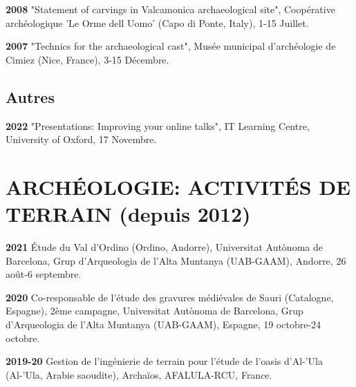 \documentclass{article}
\newcommand{\fr}[1]{#1}       %
\newcommand{\en}[1]{}     %
\begin{document}
\smallbreak
\textbf{2008 }
\fr{"Statement of carvings in Valcamonica archaeological site", Coopérative archéologique 'Le Orme dell Uomo' (Capo di Ponte, Italy), 1-15 Juillet.}
\en{"Statement of Carvings at Valcamonica Archaeological Site", Archaeological Cooperative 'Le Orme dell Uomo' (Capo di Ponte, Italy), July 1-15.}

\smallbreak
\textbf{2007 }
\fr{"Technics for the archaeological cast", Musée municipal d'archéologie de Cimiez (Nice, France), 3-15 Décembre.}
\en{"Techniques for the Archaeological Cast", Municipal Museum of Archaeology of Cimiez (Nice, France), December 3-15.}

\smallbreak

\subsection*{\fr{Autres}\en{Other}}

\textbf{2022 }
\fr{"Presentations: Improving your online talks", IT Learning Centre, University of Oxford, 17 Novembre.}
\en{"Presentations: Improving Your Online Talks", IT Learning Centre, University of Oxford, November 17.}
\smallbreak


\section{\fr{ARCHÉOLOGIE: ACTIVITÉS DE TERRAIN (depuis 2012)}\en{ARCHAEOLOGY: FIELD ACTIVITIES (since 2012)}}

\textbf{2021}
\fr{Étude du Val d'Ordino (Ordino, Andorre), Universitat Autònoma de Barcelona, Grup d'Arqueologia de l'Alta Muntanya (UAB-GAAM), Andorre, 26 août-6 septembre.}
\en{Study of the Val d'Ordino (Ordino, Andorra), Autonomous University of Barcelona, High Mountain Archaeology Group (UAB-GAAM), Andorra, August 26 - September 6.}

\smallbreak
\textbf{2020}
\fr{Co-responsable de l'étude des gravures médiévales de Sauri (Catalogne, Espagne), 2ème campagne, Universitat Autònoma de Barcelona, Grup d'Arqueologia de l'Alta Muntanya (UAB-GAAM), Espagne, 19 octobre-24 octobre.}
\en{Co-director of the study of medieval engravings at Sauri (Catalonia, Spain), 2nd campaign, Autonomous University of Barcelona, High Mountain Archaeology Group (UAB-GAAM), Spain, October 19-24.}

\smallbreak
\textbf{2019-20}
\fr{Gestion de l'ingénierie de terrain pour l'étude de l'oasis d'Al-'Ula (Al-'Ula, Arabie saoudite), Archaïos, AFALULA-RCU, France.}
\en{Field engineering management for the study of the Al-'Ula oasis (Al-'Ula, Saudi Arabia), Archaïos, AFALULA-RCU, France.}
\end{document}
